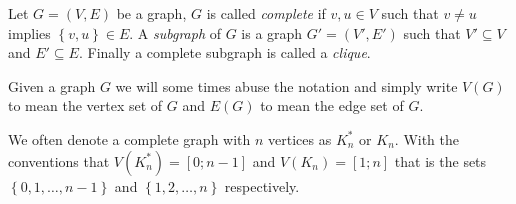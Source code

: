 \begin{definition}
	Let $G = (V, E)$ be a graph, $G$ is called \textit{complete} if $v, u \in V$ such that $v \neq u$ implies $\left\{v, u\right\} \in E$. A \textit{subgraph} of $G$ is a graph $G' = (V', E')$ such that $V' \subseteq V$ and $E' \subseteq E$. Finally a complete subgraph is called a \textit{clique}.
\end{definition}
\begin{remark}
	Given a graph $G$ we will some times abuse the notation and simply write $V(G)$ to mean the vertex set of $G$ and $E(G)$ to mean the edge set of $G$.
\end{remark}
We often denote a complete graph with $n$ vertices as $K_n^{*}$ or $K_n$. With the conventions that $V(K_n^{*}) = [0; n - 1]$ and $V(K_n) = [1; n]$ that is the sets $\left\{0, 1, \ldots, n - 1\right\}$ and $\left\{1, 2, \ldots, n\right\}$ respectively.

